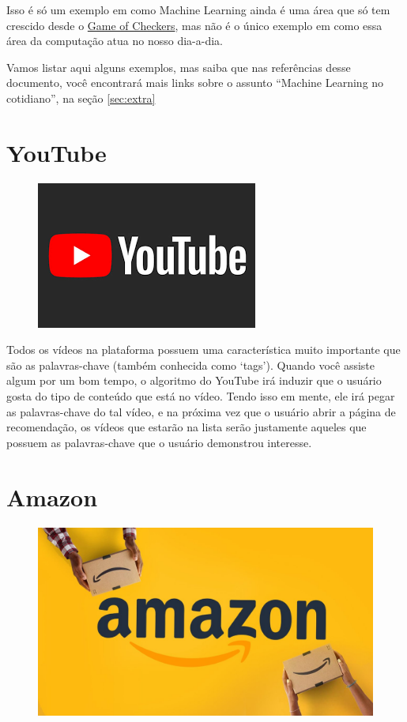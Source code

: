 \documentclass{article}
\begin{document}
    Isso é só um exemplo em como Machine Learning ainda é uma área que só tem 
    crescido desde o \href{run:../Capitulo1.pdf}{Game of Checkers}, mas não é 
    o único exemplo em como essa área da computação atua no nosso dia-a-dia.

    Vamos listar aqui alguns exemplos, mas saiba que nas referências desse 
    documento, você encontrará mais links sobre o assunto “Machine Learning 
    no cotidiano”, na seção \ref{sec:extra}

    \newpage
    \section{YouTube} 

    \begin{figure}[htp]
        \centering
        \includegraphics{youtube.png}
    \end{figure}

    Todos os vídeos na plataforma possuem uma característica muito importante
    que são as palavras-chave (também conhecida como ‘tags’). Quando você 
    assiste algum por um bom tempo, o algoritmo do YouTube irá induzir que 
    o usuário gosta do tipo de conteúdo que está no vídeo. Tendo isso em mente,
    ele irá pegar as palavras-chave do tal vídeo, e na próxima vez que o usuário 
    abrir a página de recomendação, os vídeos que estarão na lista serão 
    justamente aqueles que possuem as palavras-chave que o usuário demonstrou interesse.

    \newpage
    \section{Amazon}

    \begin{figure}[htp]
        \centering
        \includegraphics[scale=0.3]{amazon.jpg}
    \end{figure}
\end{document}
